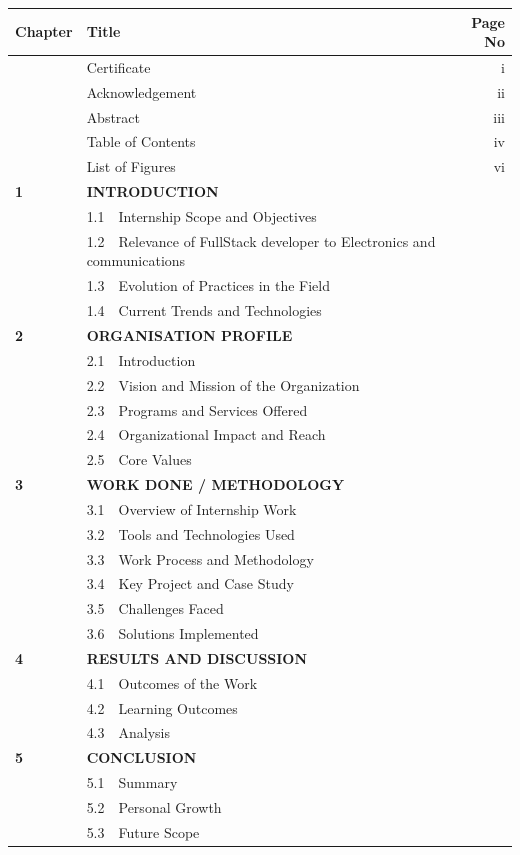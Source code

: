 \documentclass[12pt,a4paper]{report}
\begin{document}
\vspace{0.3cm}
\begin{tabular}{@{} p{1.8cm} p{10.5cm} r @{}}
\textbf{Chapter} & \textbf{Title} & \textbf{Page No} \\
\midrule
 & Certificate & i \\
 & Acknowledgement & ii \\
 & Abstract & iii \\
 & Table of Contents & iv \\
 & List of Figures & vi \\
\addlinespace[4pt]
\textbf{1} & \textbf{INTRODUCTION} & \\
 & 1.1~~Internship Scope and Objectives & \\
 & 1.2~~Relevance of FullStack developer to Electronics and communications & \\
 & 1.3~~Evolution of Practices in the Field & \\
 & 1.4~~Current Trends and Technologies & \\
\addlinespace[4pt]
\textbf{2} & \textbf{ORGANISATION PROFILE} & \\
 & 2.1~~Introduction & \\
 & 2.2~~Vision and Mission of the Organization & \\
 & 2.3~~Programs and Services Offered & \\
 & 2.4~~Organizational Impact and Reach & \\
 & 2.5~~Core Values & \\
\addlinespace[4pt]
\textbf{3} & \textbf{WORK DONE / METHODOLOGY} & \\
 & 3.1~~Overview of Internship Work & \\
 & 3.2~~Tools and Technologies Used & \\
 & 3.3~~Work Process and Methodology & \\
 & 3.4~~Key Project and Case Study & \\
 & 3.5~~Challenges Faced & \\
 & 3.6~~Solutions Implemented & \\
\addlinespace[4pt]
\textbf{4} & \textbf{RESULTS AND DISCUSSION} & \\
 & 4.1~~Outcomes of the Work & \\
 & 4.2~~Learning Outcomes & \\
 & 4.3~~Analysis & \\
\addlinespace[4pt]
\textbf{5} & \textbf{CONCLUSION} & \\
 & 5.1~~Summary & \\
 & 5.2~~Personal Growth & \\
 & 5.3~~Future Scope & \\
\end{tabular}
\end{document}
